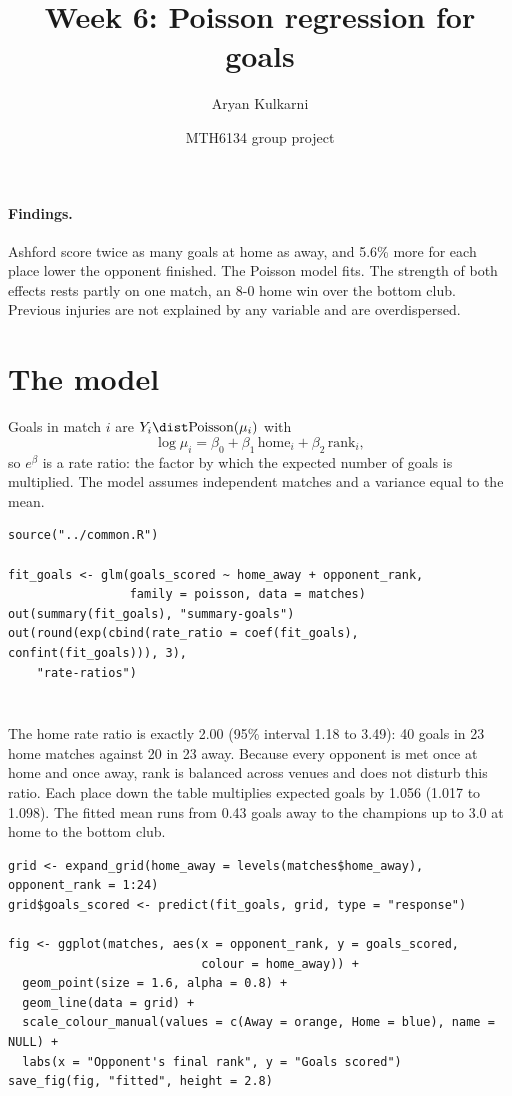 \documentclass[12pt,notitlepage]{report}
\title{Week 6: Poisson regression for goals}
\author{Aryan Kulkarni}
\date{MTH6134 group project}
\begin{document}
\maketitle

\paragraph{Findings.}
Ashford score twice as many goals at home as away, and 5.6\% more for each
place lower the opponent finished. The Poisson model fits. The strength of
both effects rests partly on one match, an 8-0 home win over the bottom club.
Previous injuries are not explained by any variable and are overdispersed.

\section{The model}

Goals in match $i$ are $Y_i \dist \text{Poisson}(\mu_i)$ with
\[
  \log \mu_i = \beta_0 + \beta_1\,\text{home}_i + \beta_2\,\text{rank}_i ,
\]
so $e^{\beta}$ is a rate ratio: the factor by which the expected number of
goals is multiplied. The model assumes independent matches and a variance
equal to the mean.

\begin{verbatim}
source("../common.R")

fit_goals <- glm(goals_scored ~ home_away + opponent_rank,
                 family = poisson, data = matches)
out(summary(fit_goals), "summary-goals")
out(round(exp(cbind(rate_ratio = coef(fit_goals), confint(fit_goals))), 3),
    "rate-ratios")
\end{verbatim}

\inputminted{text}{output/summary-goals.txt}
\inputminted{text}{output/rate-ratios.txt}

The home rate ratio is exactly 2.00 (95\% interval 1.18 to 3.49): 40 goals in
23 home matches against 20 in 23 away. Because every opponent is met once at
home and once away, rank is balanced across venues and does not disturb this
ratio. Each place down the table multiplies expected goals by 1.056 (1.017 to
1.098). The fitted mean runs from 0.43 goals away to the champions up to 3.0
at home to the bottom club.

\begin{verbatim}
grid <- expand_grid(home_away = levels(matches$home_away), opponent_rank = 1:24)
grid$goals_scored <- predict(fit_goals, grid, type = "response")

fig <- ggplot(matches, aes(x = opponent_rank, y = goals_scored,
                           colour = home_away)) +
  geom_point(size = 1.6, alpha = 0.8) +
  geom_line(data = grid) +
  scale_colour_manual(values = c(Away = orange, Home = blue), name = NULL) +
  labs(x = "Opponent's final rank", y = "Goals scored")
save_fig(fig, "fitted", height = 2.8)
\end{verbatim}
\end{document}

